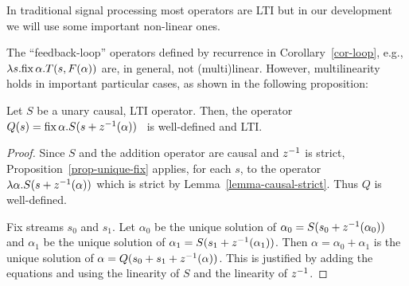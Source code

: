In traditional signal processing most operators are LTI but in our development
we will use some important non-linear ones.

The ``feedback-loop'' operators defined by recurrence in Corollary~\ref{cor-loop},
e.g., $\lambda s.\mbox{fix}\,\alpha.T(s,F(\alpha))$ are, in general, not (multi)linear.
However, multilinearity holds in important particular cases,
as shown in the following proposition:

\begin{proposition}
\label{prop-rec-linear}
Let $S$ be a unary causal, LTI operator. Then, the
operator $Q(s)=\mbox{fix}\,\alpha.S(s+z^{-1}(\alpha))$~ is well-defined and LTI.
\end{proposition}

\begin{center}
\end{center}

\begin{proof} Since $S$ and the addition operator
are causal and $z^{-1}$ is strict, Proposition~\ref{prop-unique-fix} applies,
for each $s$, to the operator
$\lambda\alpha.S(s+z^{-1}(\alpha))$ which is strict by Lemma~\ref{lemma-causal-strict}.
Thus $Q$ is well-defined.

Fix streams $s_0$ and $s_1$. Let $\alpha_0$
be the unique solution of $\alpha_0=S(s_0+z^{-1}(\alpha_0))$ and
$\alpha_1$ be the unique solution of $\alpha_1=S(s_1+z^{-1}(\alpha_1))$.
Then $\alpha=\alpha_0+\alpha_1$ is the unique solution of
$\alpha=Q(s_0+s_1+z^{-1}(\alpha))$. This is justified by adding the equations
and using the linearity of $S$ and the linearity of $z^{-1}$.
\end{proof}

